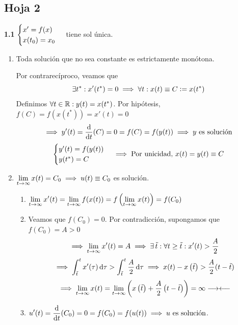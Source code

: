 \subsection{Hoja 2}

\textbf{1.1} $\displaystyle \begin{cases}
		x' = f(x) \\
		x(t_0) = x_0
	\end{cases}$ tiene sol única.
\begin{enumerate}
	\item Toda solución que no sea constante es estrictamente monótona.
	      \begin{dem}
		      Por contrarecíproco, veamos que
		      \[\displaystyle \exists t^* : x'(t^*)=0 \implies \forall t : x(t)\equiv C\vcentcolon= x(t^*)\]
		      Definimos $\forall t \in \mathbb{R}:y(t)=x(t^*)$. Por hipótesis, $f(C)=f(x(t^*))=x'(t)=0$
		      \[\implies y'(t)=\odv{}{t}(C)=0=f(C)=f(y(t))\implies y \tex{ es solución}\]
		      \[\begin{cases}
				      y'(t)=f(y(t)) \\
				      y(t^*)=C
			      \end{cases} \implies \text{Por unicidad, } x(t)=y(t)\equiv C\]
	      \end{dem}
	\item $\displaystyle \lim_{t\to \infty} x(t) = C_0 \implies u(t) \equiv C_0$ es solución.
	      \begin{dem}
		      \begin{enumerate}
			      \item $\displaystyle \lim_{t\to \infty} x'(t)=\lim_{t\to \infty}f(x(t)) = f\left(\lim_{t\to \infty} x(t)\right) = f(C_0)$
			      \item Veamos que $f(C_0)=0$. Por contradicción, supongamos que $f(C_0)=A>0$
			            \[\implies \lim_{t\to \infty} x'(t)=A \implies \exists \, \tilde{t} : \forall t \geq \tilde{t} : x'(t)>\frac{A}{2}\]
			            \[\implies \int_{\til{t}}^{t} x'(\tau) \odif{\tau} > \int_{\til{t}}^{t} \frac{A}{2} \odif{\tau} \implies x(t)-x\left(\til{t}\right)> \frac{A}{2}(t-\til{t})\]
			            \[\implies \lim_{t\to\infty} x(t) = \lim_{t\to\infty}\left(x\left(\tilde{t}\right)+\frac{A}{2}\left(t-\tilde{t}\right)\right)=\infty \longrightarrow\longleftarrow\]
			      \item $\ds u'(t) = \odv{}{t}(C_0)=0=f(C_0)=f(u(t)) \implies u \tex{ es solución}$.
		      \end{enumerate}
	      \end{dem}
\end{enumerate}

